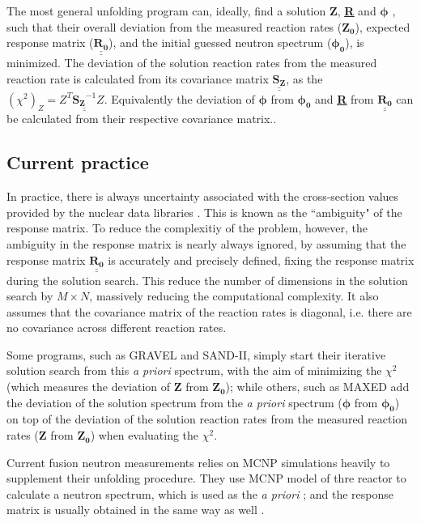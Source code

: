 \documentclass[a4paper, 12pt]{article}
\newcommand{\matr}[1]{\underline{\underline{\textbf{#1}}}}
\newcommand{\ve}[1]{\boldsymbol{#1}}
\begin{document}
The most general unfolding program can, ideally, find a solution $\ve{Z}$, \matr{R} and $\ve{\phi}$ \cite{theorypdf}, such that their overall deviation from the measured reaction rates ($\ve{Z_0}$), expected response matrix ($\underline{\underline{\mathbf{R_0}}}$), and the initial guessed neutron spectrum ($\ve{\phi_0}$), is minimized. The deviation of the solution reaction rates from the measured reaction rate is calculated from its covariance matrix $\underline{\underline{\mathbf{S_Z}}}$, as the $(\chi^2)_Z = Z^T \underline{\underline{\mathbf{S_Z}^{-1}}} Z$. Equivalently the deviation of $\ve{\phi}$ from $\ve{\phi_0}$ and \matr{R} from $\underline{\underline{\mathbf{R_0}}}$ can be calculated from their respective covariance matrix..

\subsection{Current practice}
In practice, there is always uncertainty associated with the cross-section values provided by the nuclear data libraries \cite{fluence_rate_correction_factors}. This is known as the ``ambiguity" of the response matrix. To reduce the complexitiy of the problem, however, the ambiguity in the response matrix is nearly always ignored, by assuming that the response matrix $\underline{\underline{\mathbf{R_0}}}$ is accurately and precisely defined, fixing the response matrix during the solution search. This reduce the number of dimensions in the solution search by $M\times N$, massively reducing the computational complexity. It also assumes that the covariance matrix of the reaction rates is diagonal, i.e. there are no covariance across different reaction rates.

Some programs, such as GRAVEL\cite{ManfredMatzkeHEPRO} and SAND-II\cite{SAND-II}, simply start their iterative solution search from this \emph{a priori} spectrum, with the aim of minimizing the $\chi^2$ (which measures the deviation of $\ve{Z}$ from $\ve{Z_0}$); while others, such as MAXED \cite{MAXED1998Reginatto} add the deviation of the solution spectrum from the \emph{a priori} spectrum ($\ve{\phi}$ from $\ve{\phi_0}$) on top of the deviation of the solution reaction rates from the measured reaction rates ($\ve{Z}$ from $\ve{Z_0}$) when evaluating the $\chi^2$.

Current fusion neutron measurements relies on MCNP simulations heavily to supplement their unfolding procedure. They use MCNP model of thre reactor to calculate a neutron spectrum, which is used as the \emph{a priori} \cite{MatzkeUnfoldingProcedure} \cite{InternalReportOnDeliverables_LWP}; and the response matrix is usually obtained in the same way as well \cite{bethColling_TBMD}.
\end{document}
